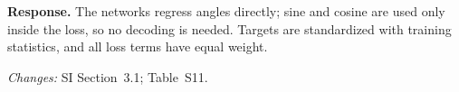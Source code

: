 \textbf{Response.} The networks regress angles directly; sine and cosine are used only inside the loss, so no decoding is needed. Targets are standardized with training statistics, and all loss terms have equal weight.

\textit{Changes:} SI Section~3.1; Table~S11.
